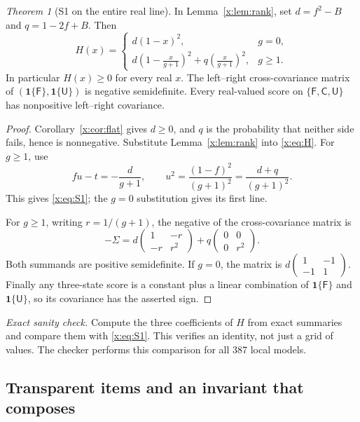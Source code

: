 \documentclass[11pt,a4paper]{article}
\theoremstyle{definition}\newtheorem{definition}[theorem]{Definition}
\theoremstyle{remark}\newtheorem{remark}[theorem]{Remark}
\newcommand{\ind}{\mathbf 1}
\newtheorem{xtheorem}{Theorem}\renewcommand{\thextheorem}{A.\arabic{xtheorem}}
\theoremstyle{definition}\newtheorem{xexample}[xtheorem]{Example}\theoremstyle{plain}
\providecommand{\ind}{\mathbf 1}
\newcommand{\Fail}{\mathsf F}\newcommand{\Clean}{\mathsf C}\newcommand{\Und}{\mathsf U}
\newcommand{\xcheck}[1]{\par\smallskip\textit{Exact sanity check.} #1\par}
\begin{document}
\begin{xtheorem}[S1 on the entire real line]\label{x:thm:S1}
In Lemma~\ref{x:lem:rank}, set $d=f^2-B$ and $q=1-2f+B$. Then
\begin{equation}\label{x:eq:S1}
\boxed{\quad H(x)=
\begin{cases}
d(1-x)^2,&g=0,\\[2pt]
\displaystyle d\left(1-\frac{x}{g+1}\right)^2+
q\left(\frac{x}{g+1}\right)^2,&g\ge1.
\end{cases}\quad}
\end{equation}
In particular $H(x)\ge0$ for every real $x$. The left--right cross-covariance matrix of $(\ind\{\Fail\},\ind\{\Und\})$ is negative semidefinite. Every real-valued score on $\{\Fail,\Clean,\Und\}$ has nonpositive left--right covariance.
\end{xtheorem}
\begin{proof}
Corollary~\ref{x:cor:flat} gives $d\ge0$, and $q$ is the probability that neither side fails, hence is nonnegative. Substitute Lemma~\ref{x:lem:rank} into \eqref{x:eq:H}. For $g\ge1$, use
\[
fu-t=-\frac{d}{g+1},\qquad
u^2=\frac{(1-f)^2}{(g+1)^2}=\frac{d+q}{(g+1)^2}.
\]
This gives \eqref{x:eq:S1}; the $g=0$ substitution gives its first line.

For $g\ge1$, writing $r=1/(g+1)$, the negative of the cross-covariance matrix is
\begin{equation}\label{x:eq:matrix}
-\Sigma=d\begin{pmatrix}1&-r\\-r&r^2\end{pmatrix}
+q\begin{pmatrix}0&0\\0&r^2\end{pmatrix}.
\end{equation}
Both summands are positive semidefinite. If $g=0$, the matrix is $d\left(\begin{smallmatrix}1&-1\\-1&1\end{smallmatrix}\right)$. Finally any three-state score is a constant plus a linear combination of $\ind\{\Fail\}$ and $\ind\{\Und\}$, so its covariance has the asserted sign.
\end{proof}
\xcheck{Compute the three coefficients of $H$ from exact summaries and compare them with \eqref{x:eq:S1}. This verifies an identity, not just a grid of values. The checker performs this comparison for all 387 local models.}

\subsection{Transparent items and an invariant that composes}
\end{document}
